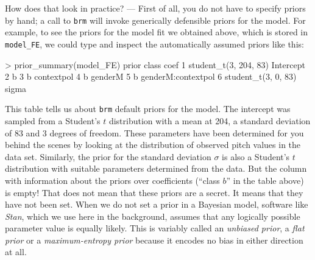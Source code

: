 \documentclass[nobib]{tufte-handout}
\begin{document}

How does that look in practice? --- First of all, you do not have to specify priors by hand; a call to \texttt{brm} will invoke generically defensible priors for the model. For example, to see the priors for the model fit we obtained above, which is stored in \texttt{model\_FE}, we could type and inspect the automatically assumed priors like this:

\begin{minipage}[]{\textwidth}
\begin{rc}
> prior_summary(model_FE)
                  prior     class               coef 
1 student_t(3, 204, 83) Intercept                    
2                               b                    
3                               b         contextpol 
4                               b            genderM 
5                               b genderM:contextpol 
6   student_t(3, 0, 83)     sigma  
\end{rc}
\end{minipage}

\vspace{-0.5cm}

This table tells us about \texttt{brm} default priors for the model. The intercept was sampled from a Student's $t$ distribution with a mean at 204, a standard deviation of 83 and 3 degrees of freedom. These parameters have been determined for you behind the scenes by looking at the distribution of observed pitch values in the data set.
%
Similarly, the prior for the standard deviation $\sigma$ is also a Student's $t$ distribution with suitable parameters determined from the data.
But the column with information about the priors over coefficients (``class $b$'' in the table above) is empty!
That does not mean that these priors are a secret.
It means that they have not been set.
When we do not set a prior in a Bayesian model, software like \emph{Stan}, which we use here in the background, assumes that any logically possible parameter value is equally likely.
This is variably called an \textit{unbiased prior}, a \textit{flat prior} or a \textit{maximum-entropy prior} because it encodes no bias in either direction at all.
\end{document}
